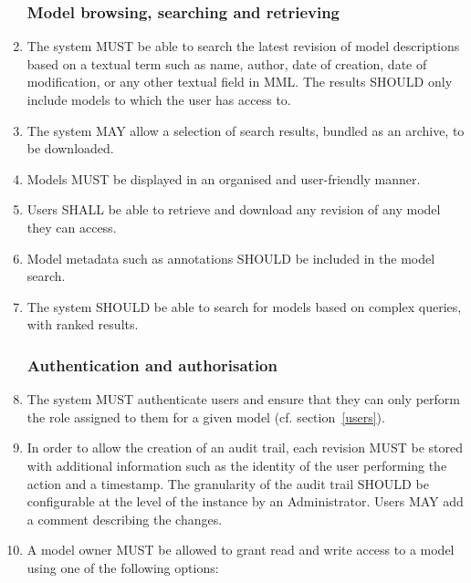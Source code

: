 \begin{enumerate}[1]
\subsubsection{Model browsing, searching and retrieving}
\item The system MUST be able to search the latest revision of model descriptions based on a textual term such as name, author, date of creation, date of modification, or any other textual field in MML. The results SHOULD only include models to which the user has access to.

\item The system MAY allow a selection of search results, bundled as an archive, to be downloaded.

\item Models MUST be displayed in an organised and user-friendly manner.

\item Users SHALL be able to retrieve and download any revision of any model they can access.

\item Model metadata such as annotations SHOULD be included in the model search.

\item The system SHOULD be able to search for models based on complex queries, with ranked results.

\subsubsection{Authentication and authorisation}
\item The system MUST authenticate users and ensure that they can only perform the role assigned to them for a given model (cf. section~\ref{users}).

\item In order to allow the creation of an \gls{audit trail}, each revision MUST be stored with additional information such as the identity of the user performing the action and a timestamp. The granularity of the audit trail SHOULD be configurable at the level of the instance by an Administrator. Users MAY add a comment describing the changes.

\item A model owner MUST be allowed to grant read and write access to a model using one of the following options:


\end{enumerate}
